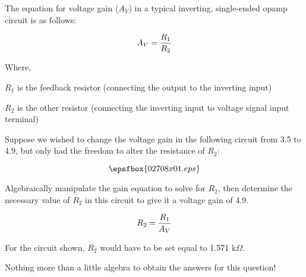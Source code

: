 

The equation for voltage gain ($A_V$) in a typical inverting, single-ended opamp circuit is as follows:

$$A_V = {R_{1} \over R_{2}}$$

\noindent
Where,

$R_1$ is the feedback resistor (connecting the output to the inverting input)

$R_2$ is the other resistor (connecting the inverting input to voltage signal input terminal)

\vskip 10pt

Suppose we wished to change the voltage gain in the following circuit from 3.5 to 4.9, but only had the freedom to alter the resistance of $R_{2}$:

$$\epsfbox{02708x01.eps}$$

Algebraically manipulate the gain equation to solve for $R_2$, then determine the necessary value of $R_2$ in this circuit to give it a voltage gain of 4.9.







$$R_2 = {R_1 \over A_V}$$

\vskip 10pt

For the circuit shown, $R_2$ would have to be set equal to 1.571 k$\Omega$.







Nothing more than a little algebra to obtain the answers for this question!





